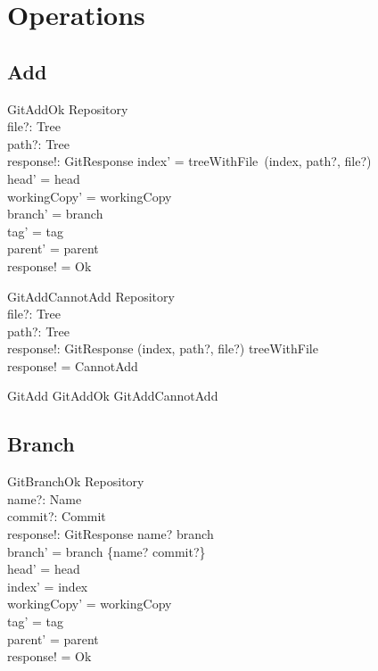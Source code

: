 \section{Operations}

\subsection{Add}

\begin{schema}{GitAddOk}
  \Delta Repository \\
  file?: Tree \\
  path?: Tree \\
  response!: GitResponse
\where
  index' = treeWithFile~(index, path?, file?) \\
  head' = head \\
  workingCopy' = workingCopy \\
  branch' = branch \\
  tag' = tag \\
  parent' = parent \\
  response! = Ok
\end{schema}

\begin{schema}{GitAddCannotAdd}
  \Xi Repository \\
  file?: Tree \\
  path?: Tree \\
  response!: GitResponse
\where
  (index, path?, file?) \notin \dom treeWithFile \\
  response! = CannotAdd
\end{schema}

\begin{zed}
  GitAdd  GitAddOk \lor GitAddCannotAdd
\end{zed}

\subsection{Branch}

\begin{schema}{GitBranchOk}
	\Delta Repository \\
	name?: Name \\
	commit?: Commit \\
	response!: GitResponse
\where
	name? \notin \dom branch \\
	branch' = branch \cup \{name? \mapsto commit?\} \\
	head' = head \\
	index' = index \\
	workingCopy' = workingCopy \\
	tag' = tag \\
	parent' = parent \\
	response! = Ok
\end{schema}

